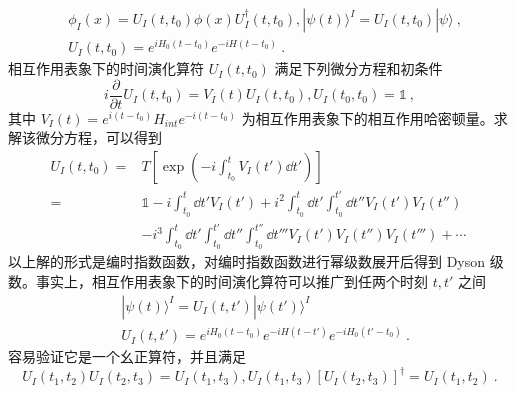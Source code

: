 \begin{equation}
\begin{aligned}
&\phi_I(x)=U_I(t,t_0)\phi(x)U_I^\dagger(t,t_0),|\psi(t)\rangle^I=U_I(t,t_0)|\psi\rangle~,\\
&U_I(t,t_0)=e^{iH_0(t-t_0)}e^{-iH(t-t_0)}~.
\end{aligned}
\end{equation}
相互作用表象下的时间演化算符 $U_I(t,t_0)$ 满足下列微分方程和初条件
\begin{equation}
i\frac{\partial}{\partial t}U_I(t,t_0)=V_I(t)U_I(t,t_0), U_I(t_0,t_0)=\mathbb{1}~,
\end{equation}
其中 $V_I(t)=e^{i(t-t_0)}H_{int} e^{-i(t-t_0)}$ 为相互作用表象下的相互作用哈密顿量。求解该微分方程，可以得到
\begin{equation}
\begin{aligned}
U_I(t,t_0)=&T\left[\exp\left(-i\int_{t_0}^{t}V_I(t')\dd t'\right)\right]\\
=&\mathbb{1}-i\int_{t_0}^t \dd t' V_I(t')+i^2\int_{t_0}^t \dd t'  \int_{t_0}^{t'} \dd t'' V_I(t')V_I(t'') \\
 &-i^3\int_{t_0}^t \dd t'  \int_{t_0}^{t'} \dd t'' \int_{t_0}^{t''}\dd t''' V_I(t')V_I(t'')V_I(t''')+\cdots
\end{aligned}~
\end{equation}
以上解的形式是编时指数函数，对编时指数函数进行幂级数展开后得到 Dyson 级数。事实上，相互作用表象下的时间演化算符可以推广到任两个时刻 $t,t'$ 之间
\begin{equation}\label{eq_Ipic_1}
\begin{aligned}
& |\psi(t)\rangle^I=U_I(t,t')|\psi(t')\rangle^I\\
& U_I(t,t')=e^{iH_0(t-t_0)}e^{-iH(t-t')}e^{-iH_0(t'-t_0)}~.
\end{aligned}
\end{equation}
容易验证它是一个幺正算符，并且满足
\begin{equation}
U_I(t_1,t_2)U_I(t_2,t_3)=U_I(t_1,t_3), U_I(t_1,t_3)[U_I(t_2,t_3)]^\dagger=U_I(t_1,t_2)~.
\end{equation}


